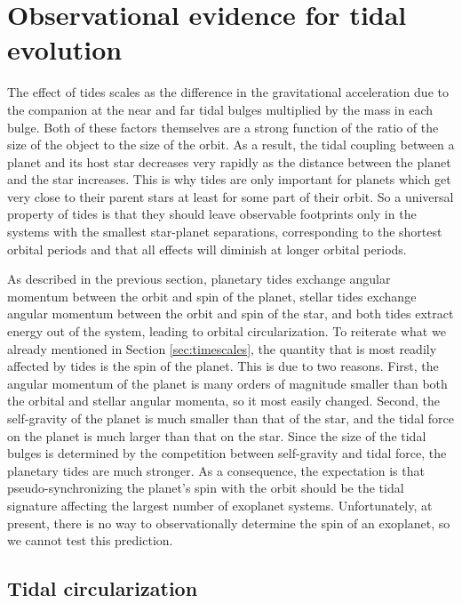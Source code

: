 \section{Observational evidence for tidal evolution}
%
\label{sec:observables}

The effect of tides scales as the difference in the gravitational acceleration
due to the companion at the near and far tidal bulges multiplied by the mass in
each bulge. Both of these factors themselves are a strong function of the ratio
of the size of the object to the size of the orbit. As a result, the tidal
coupling between a planet and its host star decreases very rapidly as the
distance between the planet and the star increases. This is why tides are only
important for planets which get very close to their parent stars at least for
some part of their orbit. So a universal property of tides is that they should
leave observable footprints only in the systems with the smallest star-planet
separations, corresponding to the shortest orbital periods and that all effects
will diminish at longer orbital periods.

As described in the previous section, planetary tides exchange angular momentum
between the orbit and spin of the planet, stellar tides exchange angular
momentum between the orbit and spin of the star, and both tides extract energy
out of the system, leading to orbital circularization.  To reiterate what we
already mentioned in Section \ref{sec:timescales}, the quantity that is most
readily affected by tides is the spin of the planet. This is due to two reasons.
First, the angular momentum of the planet is many orders of magnitude smaller
than both the orbital and stellar angular momenta, so it most easily changed.
Second, the self-gravity of the planet is much smaller than that of the star,
and the tidal force on the planet is much larger than that on the star. Since
the size of the tidal bulges is determined by the competition between
self-gravity and tidal force, the planetary tides are much stronger. As a
consequence, the expectation is that pseudo-synchronizing the planet's spin with
the orbit should be the tidal signature affecting the largest number of
exoplanet systems. Unfortunately, at present, there is no way to observationally
determine the spin of an exoplanet, so we cannot test this prediction.

\subsection{Tidal circularization}
%
\label{sec:circularization}

